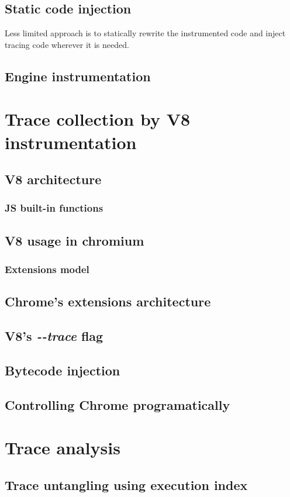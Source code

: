 \documentclass[en]{pracamgr}
\begin{document}
\section{Static code injection}
Less limited approach is to statically rewrite the instrumented code and inject tracing code wherever it is needed.


\section{Engine instrumentation}

\chapter{Trace collection by V8 instrumentation}
\section{V8 architecture}
\subsection{JS built-in functions}
\section{V8 usage in chromium}
\subsection{Extensions model}
\section{Chrome's extensions architecture}
\section{V8's \emph{-{}-trace} flag}
\section{Bytecode injection}
\section{Controlling Chrome programatically}

\chapter{Trace analysis}
\section{Trace untangling using execution index}
\end{document}
